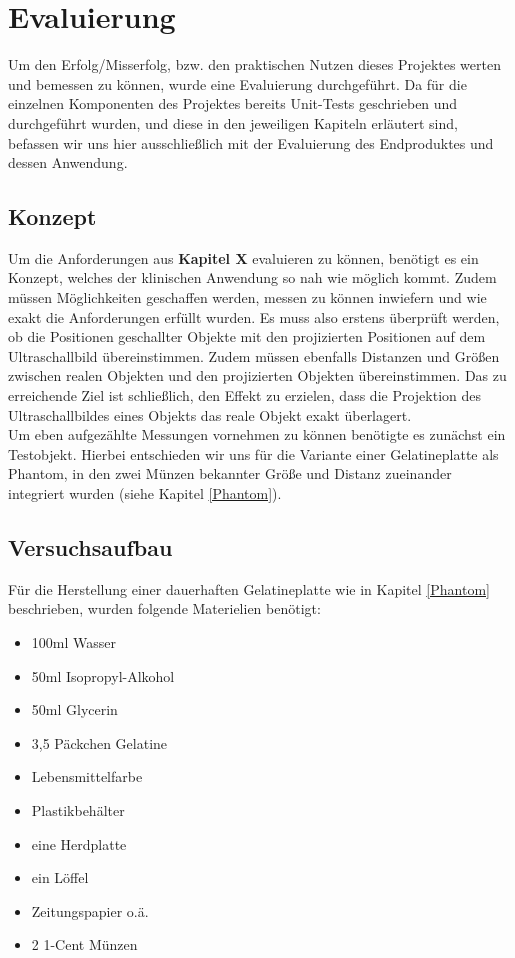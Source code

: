 \chapter{Evaluierung} \label{Evaluierung}
Um den Erfolg/Misserfolg, bzw. den praktischen Nutzen dieses Projektes werten und bemessen zu können, wurde eine Evaluierung durchgeführt. Da für die einzelnen Komponenten des Projektes bereits Unit-Tests geschrieben und durchgeführt wurden, und diese in den jeweiligen Kapiteln erläutert sind, befassen wir uns hier ausschließlich mit der Evaluierung des Endproduktes und dessen Anwendung.
\section{Konzept}
Um die Anforderungen aus \textbf{Kapitel X} evaluieren zu können, benötigt es ein Konzept, welches der klinischen Anwendung so nah wie möglich kommt. Zudem müssen Möglichkeiten geschaffen werden, messen zu können inwiefern und wie exakt die Anforderungen erfüllt wurden. Es muss also erstens überprüft werden, ob die Positionen geschallter Objekte mit den projizierten Positionen auf dem Ultraschallbild übereinstimmen. Zudem müssen ebenfalls Distanzen und Größen zwischen realen Objekten und den projizierten Objekten übereinstimmen. Das zu erreichende Ziel ist schließlich, den Effekt zu erzielen, dass die Projektion des Ultraschallbildes eines Objekts das reale Objekt exakt überlagert. 
\\
Um eben aufgezählte Messungen vornehmen zu können benötigte es zunächst ein Testobjekt. Hierbei entschieden wir uns für die Variante einer Gelatineplatte als Phantom, in den zwei Münzen bekannter Größe und Distanz zueinander integriert wurden (siehe Kapitel \ref{Phantom}). 
\clearpage
\section{Versuchsaufbau} \label{Versuchsaufbau}
Für die Herstellung einer dauerhaften Gelatineplatte wie in Kapitel \ref{Phantom} beschrieben, wurden folgende Materielien benötigt:
\begin{itemize}
\item 100ml Wasser
\item 50ml Isopropyl-Alkohol
\item 50ml Glycerin
\item 3,5 Päckchen Gelatine
\item Lebensmittelfarbe
\item Plastikbehälter
\item eine Herdplatte
\item ein Löffel
\item Zeitungspapier o.ä.
\item 2 1-Cent Münzen
\end{itemize}

